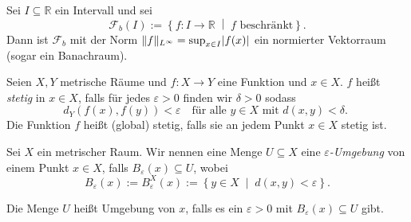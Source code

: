 \documentclass[
12pt, 
openany, 
a4paper, 
final,
fleqn, 
]{myclass}
\numberwithin{equation}{chapter}
\numberwithin{section}{chapter}
\newcommand{\RR}{\mathbb R}
\newcommand{\varF}{\mathcal F}
\newcommand{\set}[2]{\left\{#1\;\middle|\;#2\right\}}
\DeclarePairedDelimiter{\abs}{\lvert}{\rvert}
\DeclarePairedDelimiter{\norm}{\lVert}{\rVert}
\begin{document}
\begin{eg}\label{1.6}
Sei $I\subseteq \RR$ ein Intervall und sei 
\[
\varF_b(I) := \set{f: I\to \mathbb{R}}{f \text{ beschränkt}}.
\]
Dann ist $\varF_b$ mit der Norm $\norm f_{L^\infty} = \sup_{x\in I}\abs{f(x)}$ ein normierter Vektorraum (sogar ein Banachraum). 
\end{eg}
\begin{defn}\label{1.7}
Seien $X, Y$ metrische Räume und $f: X\to Y$ eine Funktion und $x\in X$. $f$ heißt \emph{stetig} in $x\in X$, falls für jedes $\varepsilon>0$ finden wir $\delta>0$ sodass 
\[
d_Y(f(x), f(y)) <\varepsilon \quad \text{für alle $y\in X$ mit $d(x, y) < \delta$. }
\]
Die Funktion $f$ heißt (global) stetig, falls sie an jedem Punkt $x\in X$ stetig ist. 
\end{defn}
\begin{defn}\label{1.8}

Sei $X$ ein metrischer Raum. Wir nennen eine Menge $U\subseteq X$ eine \emph{$\varepsilon$-Umgebung} von einem Punkt $x\in X$, falls $B_\varepsilon(x) \subseteq U$, wobei 
\[
B_\varepsilon(x) := B^{X}_{\varepsilon}(x):= \set{y\in X}{ d(x, y) <\varepsilon}.
\]

Die Menge $U$ heißt Umgebung von $x$, falls es ein $\varepsilon>0$ mit $B_\varepsilon(x) \subseteq U$ gibt.
\end{defn}
\end{document}
